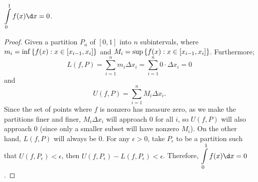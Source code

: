 \begin{answer}
  \begin{claim}
    $\displaystyle \int\limits_0^1 f(x) \d x = 0$.
    \begin{proof}
      Given a partition $P_n$ of $[0, 1]$ into $n$ subintervals,
      \blue{\[
        L(f, P) = \sum_{i=1}^n m_i \Delta x_i
                \leq \int \limits_0^1 f(x) \d x
                \leq \sum_{i=1}^n M_i \Delta x_i
                = U(f, P),
      \]}
      where $m_i = \inf\left\{f(x) : x \in [x_{i-1}, x_i]\right\}$ and
      $M_i = \sup\left\{f(x) : x \in [x_{i-1}, x_i]\right\}$.
      Furthermore;
      \begin{equation}
        L(f, P) = \sum_{i=1}^n m_i \Delta x_i
                = \sum_{i=1}^n 0 \cdot \Delta x_i
                = 0
      \end{equation}
      and
      \begin{equation}
        U(f, P) = \sum_{i=1}^n M_i \Delta x_i.
      \end{equation}
      Since the set of points where $f$ is nonzero has measure zero,
      as we make the partitions finer and finer, $M_i \Delta x_i$ will
      approach $0$ for all $i$, so $U(f, P)$ will also approach $0$
      (since only a smaller subset will have nonzero $M_i$).
      On the other hand, $L(f, P)$ will always be $0$.
      For any $\epsilon > 0$, take $P_\epsilon$ to be a partition such that
      $U(f, P_\epsilon) < \epsilon$, then $U(f, P_\epsilon) - L(f, P_\epsilon) < \epsilon$.
      Therefore, $\displaystyle \int\limits_0^1 f(x) \d x = 0$.
    \end{proof}
  \end{claim}
\end{answer}
